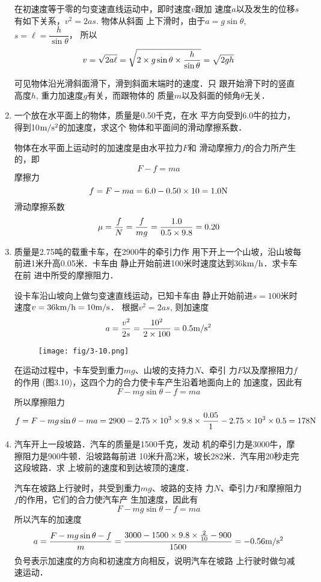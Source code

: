 \begin{enumerate}
\begin{solution}
在初速度等于零的匀变速直线运动中，即时速度$v$跟加
速度$a$以及发生的位移$s$有如下关系，$v^2=2as$. 物体从斜面
上下滑时，由于$a=g\sin\theta$, $s=\ell=\dfrac{h}{\sin\theta}$，
所以
\[v=\sqrt{2a\ell}=\sqrt{2\times g\sin\theta\times \frac{h}{\sin\theta}}=\sqrt{2gh}\]

可见物体沿光滑斜面滑下，滑到斜面末端时的速度．只
跟开始滑下时的竖直高度$h$, 重力加速度$g$有关，而跟物体的
质量$m$以及斜面的倾角$\theta$无关．
\end{solution}
\item  一个放在水平面上的物体，质量是0.50千克，在水
平方向受到6.0牛的拉力，得到10$\text{m}/\text{s}^2$的加速度，求这个
物体和平面间的滑动摩擦系数．

\begin{solution}
    物体在水平面上运动时的加速度是由水平拉力$F$和
滑动摩擦力$f$的合力所产生的，即
\[F-f=ma\]
摩擦力
\[f=F-ma=6.0-0.50\times10=1.0{\rm N}\]
滑动摩擦系数
\[\mu =\frac{f}{N}=\frac{f}{mg}=\frac{1.0}{0.5\times 9.8}=0.20\]
\end{solution}
\item   质量是2.75吨的载重卡车，在2900牛的牵引力作
用下开上一个山坡，沿山坡每前进1米升高0.05米．卡车由
静止开始前进100米时速度达到36$\text{km}/\text{h}$．求卡车在前
进中所受的摩擦阻力．

\begin{solution}
 设卡车沿山坡向上做匀变速直线运动，已知卡车由
静止开始前进$s=100$米时速度$v=36\text{km}/\text{h}=10\text{m}/\text{s}$．
根据$v^2=2as$, 则加速度
\[a=\frac{v^2}{2s}=\frac{10^2}{2\times 100}=0.5\text{m}/\text{s}^2\]

\begin{figure}[htp]
    \centering
\texttt{[image: fig/3-10.png]}
    \caption{}
\end{figure}

在运动过程中，卡车受到重力$mg$、山坡的支持力$N$、牵引
力$F$以及摩擦阻力$f$的作用
(图3.10)，这四个力的合力使卡车产生沿着地面向上的
加速度，因此有
\[F-mg\sin\theta-f=ma\]
所以摩擦阻力
\[f=F-mg\sin\theta-ma=2900-2.75\times10^3\times9.8\times\frac{0.05}{1}-2.75\times 10^3\times 0.5=178{\rm N}\]
\end{solution}
\item  汽车开上一段坡路．汽车的质量是1500千克，发动
机的牵引力是3000牛，摩擦阻力是900牛顿．沿坡路每前进
10米升高2米，坡长282米．汽车用20秒走完这段坡路．求
上坡前的速度和到达坡顶的速度．

\begin{solution}
汽车在坡路上行驶时，共受到重力$mg$、坡路的支持
力$N$、牵引力$F$和摩擦阻力$f$的作用，它们的合力使汽车产
生加速度，因此有
\[F-mg\sin\theta-f=ma\]
所以汽车的加速度
\[a=\frac{F-mg\sin\theta-f}{m}=\frac{3000-1500\times9.8\times\frac{2}{10}-900}{1500}=-0.56\text{m}/\text{s}^2\]
负号表示加速度的方向和初速度方向相反，说明汽车在坡路
上行驶时做匀减速运动．


\end{solution}
\end{enumerate}
